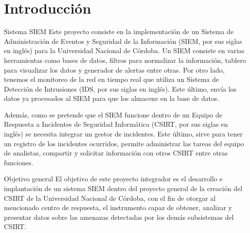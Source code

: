 \chapter{\Large Introducción}
    \begin{section}{Sistema SIEM}
        Este proyecto consiste en la implementación de un Sistema de Administración de Eventos y Seguridad de la Información (SIEM, por sus siglas en inglés) para la Universidad Nacional de Córdoba. Un SIEM consiste en varias herramientas como bases de datos, filtros para normalizar la información, tablero para visualizar los datos y generador de alertas entre otras. Por otro lado, tenemos el monitoreo de la red en tiempo real que utiliza un Sistema de Detección de Intrusiones (IDS, por sus siglas en inglés). Este último, envía los datos ya procesados al SIEM para que los almacene en la base de datos. \par
        Además, como se pretende que el SIEM funcione dentro de un Equipo de Respuesta a Incidentes de Seguridad Informática (CSIRT, por sus siglas en inglés) se necesita integrar un gestor de incidentes. Este último, sirve para tener un registro de los incidentes ocurridos, permite administrar las tareas del equipo de analistas, compartir y solicitar información con otros CSIRT entre otras funciones.
    \end{section}
    \begin{section}{Objetivo general}
        El objetivo de este proyecto integrador es el desarrollo e implantación de un sistema SIEM dentro del proyecto general de la creación del CSIRT de la Universidad Nacional de Córdoba, con el fin de otorgar al mencionado centro de respuesta, el instrumento capaz de obtener, analizar y presentar datos sobre las amenazas detectadas por los demás subsistemas del CSIRT.
    \end{section}
    
